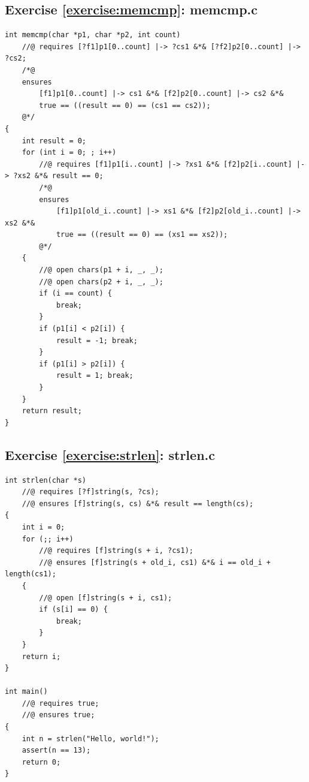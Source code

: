 \documentclass{article}
\begin{document}
\subsection{Exercise \ref{exercise:memcmp}:
memcmp.c}\label{solution:memcmp}

\begin{lstlisting}
int memcmp(char *p1, char *p2, int count)
    //@ requires [?f1]p1[0..count] |-> ?cs1 &*& [?f2]p2[0..count] |-> ?cs2;
    /*@
    ensures
        [f1]p1[0..count] |-> cs1 &*& [f2]p2[0..count] |-> cs2 &*&
        true == ((result == 0) == (cs1 == cs2));
    @*/
{
    int result = 0;
    for (int i = 0; ; i++)
        //@ requires [f1]p1[i..count] |-> ?xs1 &*& [f2]p2[i..count] |-> ?xs2 &*& result == 0;
        /*@
        ensures
            [f1]p1[old_i..count] |-> xs1 &*& [f2]p2[old_i..count] |-> xs2 &*&
            true == ((result == 0) == (xs1 == xs2));
        @*/
    {
        //@ open chars(p1 + i, _, _);
        //@ open chars(p2 + i, _, _);
        if (i == count) {
            break;
        }
        if (p1[i] < p2[i]) {
            result = -1; break;
        }
        if (p1[i] > p2[i]) {
            result = 1; break;
        }
    }
    return result;
}\end{lstlisting}

\subsection{Exercise \ref{exercise:strlen}: strlen.c}\label{solution:strlen}

\begin{lstlisting}
int strlen(char *s)
    //@ requires [?f]string(s, ?cs);
    //@ ensures [f]string(s, cs) &*& result == length(cs);
{
    int i = 0;
    for (;; i++)
        //@ requires [f]string(s + i, ?cs1);
        //@ ensures [f]string(s + old_i, cs1) &*& i == old_i + length(cs1);
    {
        //@ open [f]string(s + i, cs1);
        if (s[i] == 0) {
            break;
        }
    }
    return i;
}

int main()
    //@ requires true;
    //@ ensures true;
{
    int n = strlen("Hello, world!");
    assert(n == 13);
    return 0;
}
\end{lstlisting}
\end{document}
